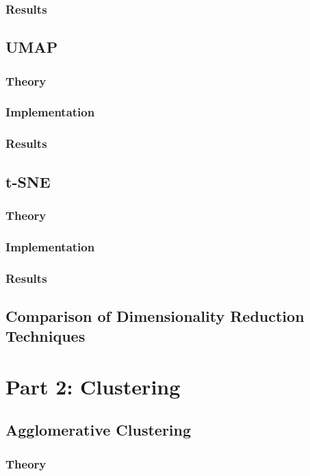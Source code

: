 \documentclass[12pt]{article}
\begin{document}
\subsubsection{Results}

\subsection{UMAP}
\subsubsection{Theory}

\subsubsection{Implementation}

\subsubsection{Results}

\subsection{t-SNE}
\subsubsection{Theory}

\subsubsection{Implementation}

\subsubsection{Results}

\subsection{Comparison of Dimensionality Reduction Techniques}

\section{Part 2: Clustering}
\subsection{Agglomerative Clustering}
\subsubsection{Theory}
\end{document}
